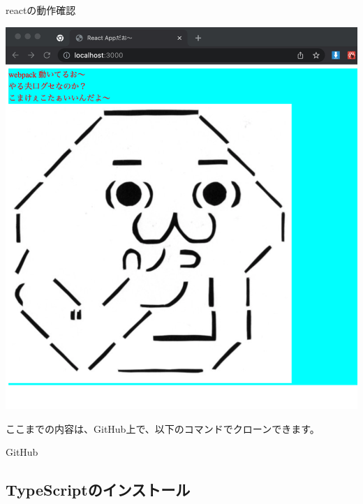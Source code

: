 \def\startercodeblockfontsize{}
\begin{starterterminal}[]{reactの動作確認}\end{starterterminal}
\begin{reviewimage}%
\includegraphics[width=1.0\maxwidth]{./images/02-create-react-app/babel09.png}%
\label{image:02-create-react-app:babel09}
\end{reviewimage}
\begin{starternote}[]{}

ここまでの内容は、GitHub上で、以下のコマンドでクローンできます。

\def\startercodeblockfontsize{}
\begin{starterterminal}[]{GitHub}\end{starterterminal}
\end{starternote}

\subsection{TypeScriptのインストール}
\keeplastskip{
  \label{sec:2-2-8}
  \label{sec04-typescript}
  \par\nobreak
}

